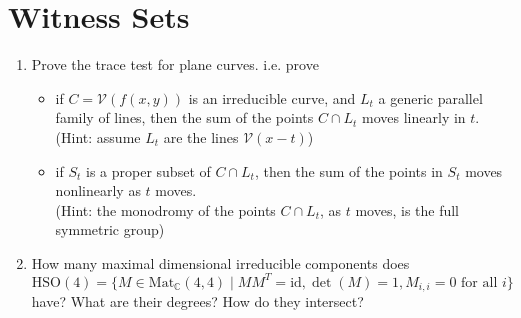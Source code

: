 \documentclass[11pt,reqno]{amsart}
\theoremstyle{definition}
\theoremstyle{remark}
\numberwithin{equation}{section}
\begin{document}
\section{Witness Sets}
\begin{enumerate}
\item Prove the trace test for plane curves. i.e. prove
\begin{itemize}
\item if $C=\mathcal{V}(f(x,y))$ is an irreducible curve, and $L_t$ a generic parallel family of lines, then the sum of the points $C \cap L_t$ moves linearly in $t$. \\ (Hint: assume $L_t$ are the lines $\mathcal{V}(x-t)$)

\item if $S_t$ is a proper subset of $C \cap L_t$, then the sum of the points in $S_t$ moves nonlinearly as $t$ moves. \\ (Hint: the monodromy of the points $C \cap L_t$, as $t$ moves, is the full symmetric group)
\end{itemize}

\item How many maximal dimensional irreducible components does
$$\text{HSO}(4) = \{M \in \text{Mat}_{\mathbb{C}}(4,4) \mid MM^T= \textrm{id}, \det(M) = 1, M_{i,i}=0 \text{ for all }i\}$$
have? What are their degrees? How do they intersect?



\end{enumerate}
\end{document}
